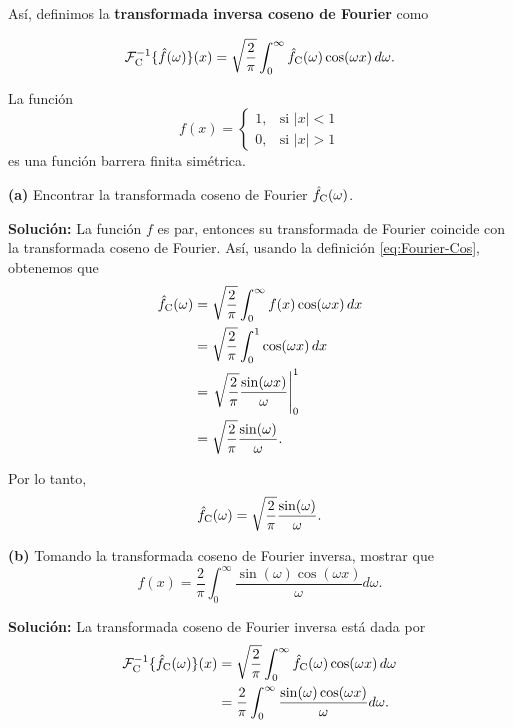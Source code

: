 Así, definimos la \textbf{transformada inversa coseno de Fourier} como
\begin{shaded}
    \begin{equation}
         \mathcal{F}^{-1}_{\rm C}\{\hat{f}(\omega)\}(x) = \sqrt{\frac{2}{\pi}} \int_{0}^{\infty} \hat{f}_{\rm C}(\omega) \cos(\omega x) \,d\omega. 
    \end{equation}
\end{shaded}

\begin{ejemplo}
    La función
\begin{equation}
    f(x) = \left\{ \begin{array}{cl}
        1, & \text{si $|x| < 1$}  \\
        0, & \text{si $|x| > 1$}
    \end{array} \right.
\end{equation}
es una función barrera finita simétrica.

\textbf{(a)} Encontrar la transformada coseno de Fourier $\hat{f}_{\rm C}(\omega)$.

\textbf{Solución:} La función $f$ es par, entonces su transformada de Fourier coincide con la transformada coseno de Fourier. Así, usando la definición \eqref{eq:Fourier-Cos}, obtenemos que
\begin{align}
    \hat{f}_{\rm C}(\omega) &= \sqrt{\frac{2}{\pi}} \int_0^{\infty}f(x) \cos(\omega x) \,dx \nonumber\\
    &= \sqrt{\frac{2}{\pi}} \int_{0}^{1} \cos(\omega x) \,dx \nonumber \\
    &= \left. \sqrt{\frac{2}{\pi}} \frac{\sin(\omega x)}{\omega} \right|_{0}^{1} \nonumber \\
    &= \sqrt{\frac{2}{\pi}} \frac{\sin(\omega)}{\omega}.
\end{align}

Por lo tanto,
\begin{equation}
    \hat{f}_{\rm C}(\omega) = \sqrt{\frac{2}{\pi}} \frac{\sin(\omega)}{\omega}.
\end{equation}

\textbf{(b)} Tomando la transformada coseno de Fourier inversa, mostrar que 
\begin{equation}
    f(x) = \frac{2}{\pi} \int_{0}^{\infty} \frac{\sin(\omega) \cos(\omega x)}{\omega} d\omega.
\end{equation}

\textbf{Solución:} La transformada coseno de Fourier inversa está dada por
\begin{align}
    \mathcal{F}^{-1}_{\rm C}\{\hat{f}_{\rm C}(\omega)\}(x) &= \sqrt{\frac{2}{\pi}} \int_{0}^{\infty} \hat{f}_{\rm C}(\omega) \cos(\omega x) \,d\omega \\
    &= \frac{2}{\pi} \int_{0}^{\infty} \frac{\sin(\omega) \cos(\omega x)}{\omega} d\omega. \label{eq:sign-funcion-inv}
\end{align}


\end{ejemplo}
